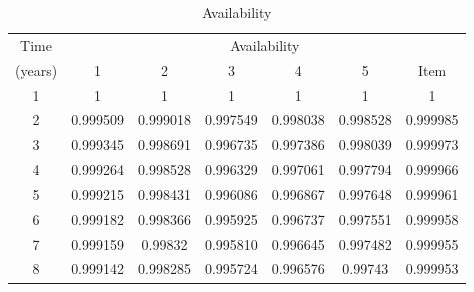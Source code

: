 \begin{table}[h]
\caption{Availability}
\begin{tabular}{|l|l|l|l|l|l|l|}
\hline
\multicolumn{1}{|c|}{Time} & \multicolumn{6}{c|}{Availability} \\ 
\cline{2-7}
\multicolumn{1}{|c|}{(years)} & \multicolumn{1}{c|}{1} & \multicolumn{1}{c|}{2} & \multicolumn{1}{c|}{3} & \multicolumn{1}{c|}{4} & \multicolumn{1}{c|}{5} & \multicolumn{1}{c|}{Item} \\ 
\hline
\multicolumn{1}{|c|}{1} & \multicolumn{1}{c|}{1} & \multicolumn{1}{c|}{1} & \multicolumn{1}{c|}{1} & \multicolumn{1}{c|}{1} & \multicolumn{1}{c|}{1} & \multicolumn{1}{c|}{1} \\ 
\hline
\multicolumn{1}{|c|}{2} & \multicolumn{1}{c|}{0.999509} & \multicolumn{1}{c|}{0.999018} & \multicolumn{1}{c|}{0.997549} & \multicolumn{1}{c|}{0.998038} & \multicolumn{1}{c|}{0.998528} & \multicolumn{1}{c|}{0.999985} \\ 
\hline
\multicolumn{1}{|c|}{3} & \multicolumn{1}{c|}{0.999345} & \multicolumn{1}{c|}{0.998691} & \multicolumn{1}{c|}{0.996735} & \multicolumn{1}{c|}{0.997386} & \multicolumn{1}{c|}{0.998039} & \multicolumn{1}{c|}{0.999973} \\ 
\hline
\multicolumn{1}{|c|}{4} & \multicolumn{1}{c|}{0.999264} & \multicolumn{1}{c|}{0.998528} & \multicolumn{1}{c|}{0.996329} & \multicolumn{1}{c|}{0.997061} & \multicolumn{1}{c|}{0.997794} & \multicolumn{1}{c|}{0.999966} \\ 
\hline
\multicolumn{1}{|c|}{5} & \multicolumn{1}{c|}{0.999215} & \multicolumn{1}{c|}{0.998431} & \multicolumn{1}{c|}{0.996086} & \multicolumn{1}{c|}{0.996867} & \multicolumn{1}{c|}{0.997648} & \multicolumn{1}{c|}{0.999961} \\ 
\hline
\multicolumn{1}{|c|}{6} & \multicolumn{1}{c|}{0.999182} & \multicolumn{1}{c|}{0.998366} & \multicolumn{1}{c|}{0.995925} & \multicolumn{1}{c|}{0.996737} & \multicolumn{1}{c|}{0.997551} & \multicolumn{1}{c|}{0.999958} \\ 
\hline
\multicolumn{1}{|c|}{7} & \multicolumn{1}{c|}{0.999159} & \multicolumn{1}{c|}{0.99832} & \multicolumn{1}{c|}{0.995810} & \multicolumn{1}{c|}{0.996645} & \multicolumn{1}{c|}{0.997482} & \multicolumn{1}{c|}{0.999955} \\ 
\hline
\multicolumn{1}{|c|}{8} & \multicolumn{1}{c|}{0.999142} & \multicolumn{1}{c|}{0.998285} & \multicolumn{1}{c|}{0.995724} & \multicolumn{1}{c|}{0.996576} & \multicolumn{1}{c|}{0.99743} & \multicolumn{1}{c|}{0.999953} \\ 
\hline

\end{tabular}
\end{table}
